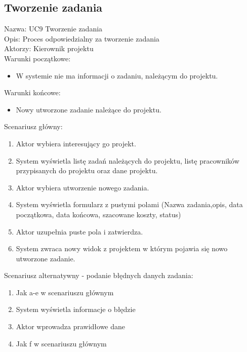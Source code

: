 \subsection{Tworzenie zadania}
Nazwa: UC9 Tworzenie zadania\\
Opis: Proces odpowiedzialny za tworzenie zadania\\
Aktorzy: Kierownik projektu \\
Warunki początkowe:
\begin{itemize}
\item W systemie nie ma informacji o zadaniu, należącym do projektu.
\end{itemize}
Warunki końcowe:
\begin{itemize}
\item Nowy utworzone zadanie należące do projektu.
\end{itemize}
Scenariusz główny:
\begin{enumerate}
\item Aktor wybiera interesujący go projekt.
\item System wyświetla listę zadań należących do projektu, listę pracowników przypisanych do projektu oraz dane projektu.
\item Aktor wybiera utworzenie nowego zadania.
\item System wyświetla formularz z pustymi polami (Nazwa zadania,opis, data początkowa, data końcowa, szacowane koszty, status)
\item Aktor uzupełnia puste pola i zatwierdza.
\item System zwraca nowy widok z projektem w którym pojawia się nowo utworzone zadanie.
\end{enumerate}
Scenariusz alternatywny - podanie błędnych danych zadania: 
\begin{enumerate}
\item Jak a-e w scenariuszu głównym
\item System wyświetla informacje o błędzie
\item Aktor wprowadza prawidłowe dane
\item Jak f w scenariuszu głównym
\end{enumerate}

